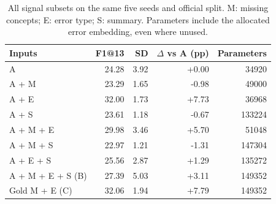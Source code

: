 \begin{table}[htbp]\centering\small
\caption{All signal subsets on the same five seeds and official split. M: missing concepts; E: error type; S: summary. Parameters include the allocated error embedding, even where unused.}\label{tab:ablations}
\begin{tabular}{@{}lrrrr@{}}\toprule
Inputs & F1@13 & SD & $\Delta$ vs A (pp) & Parameters\\\midrule
A & 24.28 & 3.92 & +0.00 & 34920\\
A + M & 23.29 & 1.65 & -0.98 & 49000\\
A + E & 32.00 & 1.73 & +7.73 & 36968\\
A + S & 23.61 & 1.18 & -0.67 & 133224\\
A + M + E & 29.98 & 3.46 & +5.70 & 51048\\
A + M + S & 22.97 & 1.21 & -1.31 & 147304\\
A + E + S & 25.56 & 2.87 & +1.29 & 135272\\
A + M + E + S (B) & 27.39 & 5.03 & +3.11 & 149352\\
Gold M + E (C) & 32.06 & 1.94 & +7.79 & 149352\\
\bottomrule\end{tabular}\end{table}
